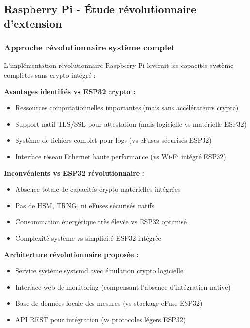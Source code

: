 \begin{table}[h]
\subsection{Raspberry Pi - Étude révolutionnaire d'extension}

\subsubsection{Approche révolutionnaire système complet}

L'implémentation révolutionnaire Raspberry Pi leverait les capacités système complètes sans crypto intégré :

\textbf{Avantages identifiés vs ESP32 crypto :}
\begin{itemize}
    \item Ressources computationnelles importantes (mais sans accélérateurs crypto)
    \item Support natif TLS/SSL pour attestation (mais logicielle vs matérielle ESP32)
    \item Système de fichiers complet pour logs (vs eFuses sécurisés ESP32)
    \item Interface réseau Ethernet haute performance (vs Wi-Fi intégré ESP32)
\end{itemize}

\textbf{Inconvénients vs ESP32 révolutionnaire :}
\begin{itemize}
    \item Absence totale de capacités crypto matérielles intégrées
    \item Pas de HSM, TRNG, ni eFuses sécurisés natifs
    \item Consommation énergétique très élevée vs ESP32 optimisé
    \item Complexité système vs simplicité ESP32 intégrée
\end{itemize}

\textbf{Architecture révolutionnaire proposée :}
\begin{itemize}
    \item Service système systemd avec émulation crypto logicielle
    \item Interface web de monitoring (compensant l'absence d'intégration native)
    \item Base de données locale des mesures (vs stockage eFuse ESP32)
    \item API REST pour intégration (vs protocoles légers ESP32)
\end{itemize}


\end{table}
